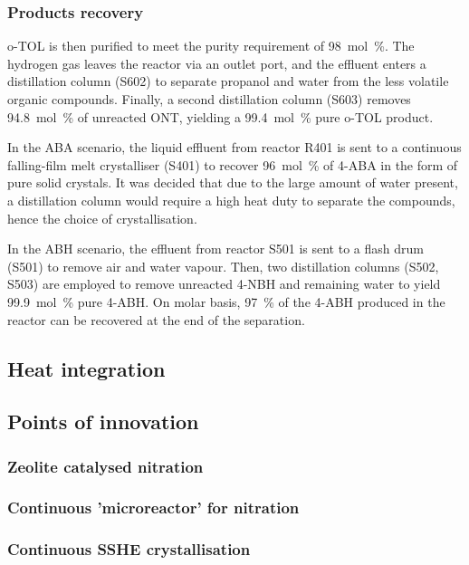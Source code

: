 \subsubsection{Products recovery}

o-TOL is then purified to meet the purity requirement of \SI{98}{mol\percent}.
The hydrogen gas leaves the reactor via an outlet port, and the effluent enters a distillation column (S602) to separate propanol and water from the less volatile organic compounds.
Finally, a second distillation column (S603) removes \SI{94.8}{mol\percent} of unreacted ONT, yielding a \SI{99.4}{mol\percent} pure o-TOL product.

In the ABA scenario, the liquid effluent from reactor R401 is sent to a continuous falling-film melt crystalliser (S401) to recover \SI{96}{mol\percent} of 4-ABA in the form of pure solid crystals. It was decided that due to the large amount of water present, a distillation column would require a high heat duty to separate the compounds, hence the choice of crystallisation. 

 In the ABH scenario, the effluent from reactor S501 is sent to a flash drum (S501) to remove air and water vapour. Then, two distillation columns (S502, S503) are employed to remove unreacted 4-NBH and remaining water to yield  \SI{99.9}{mol\percent} pure 4-ABH. On molar basis, \SI{97}{\percent} of the 4-ABH produced in the reactor can be recovered at the end of the separation.






\subsection{Heat integration}


\subsection{Points of innovation}

\subsubsection{Zeolite catalysed nitration}

\subsubsection{Continuous 'microreactor' for nitration}

\subsubsection{Continuous SSHE crystallisation}